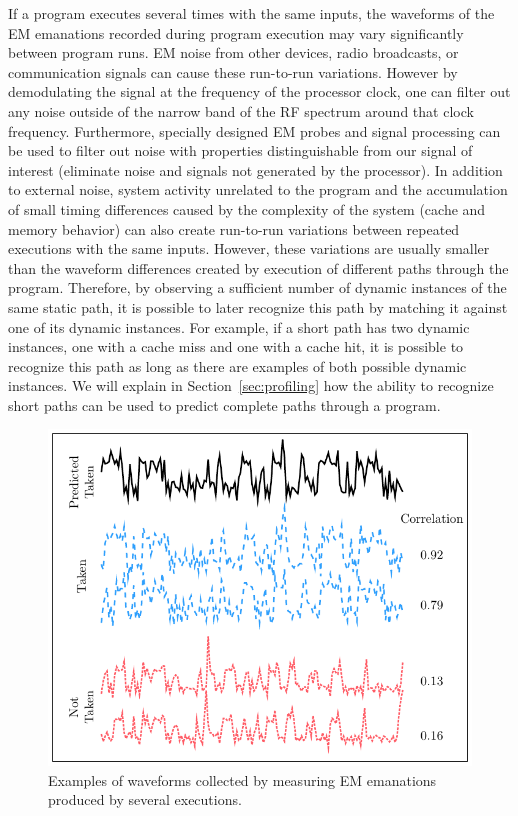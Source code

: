 If a program executes several times with the same inputs, the waveforms of the EM emanations recorded during program execution may vary significantly between program runs. EM noise from other devices, radio broadcasts, or communication signals can cause these run-to-run variations. However by demodulating the signal at the frequency of the processor clock, one can filter out any noise outside of the narrow band of the RF spectrum around that clock frequency. Furthermore, specially designed EM probes and signal processing can be used to filter out noise with properties distinguishable from our signal of interest (\eg eliminate noise and signals not generated by the processor). In addition to external noise, system activity unrelated to the program and the accumulation of small timing differences caused by the complexity of the system (\eg cache and memory behavior) can also create run-to-run variations between repeated executions with the same inputs. However, these variations are usually smaller than the waveform differences created by execution of different paths through the program. Therefore, by observing a sufficient number of dynamic instances of the same static path, it is possible to later recognize this path by matching it against one of its dynamic instances. For example, if a short path has two dynamic instances, one with a cache miss and one with a cache hit, it is possible to recognize this path as long as there are examples of both possible dynamic instances. We will explain in Section~\ref{sec:profiling} how the ability to recognize short paths can be used to predict complete paths through a program.

\begin{figure}[htb]
  \center
\includegraphics[width=5in]{../issta_profile/profiling/figures/branch_predict}
\caption{Examples of waveforms collected by measuring EM emanations produced by several executions.}
\label{fig:branch_predict}
\end{figure}

